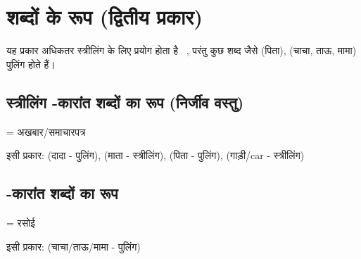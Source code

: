 \section{शब्दों के रूप (द्वितीय प्रकार)}\label{sec:noun-endings-second-declension}
यह प्रकार अधिकतर स्त्रीलिंग के लिए प्रयोग होता है ~\cite{readyruss2021, levine2009}, परंतु कुछ शब्द जैसे  (पिता),  (चाचा, ताऊ,
मामा) पुलिंग होते हैं।

\subsection{स्त्रीलिंग -कारांत शब्दों का रूप (निर्जीव वस्तु)}\label{subsec:noun-endings-second-declension-hard}
 = अखबार/समाचारपत्र

इसी प्रकार:  (दादा - पुलिंग),  (माता - स्त्रीलिंग),   (पिता - पुलिंग),  (गाड़ी/car - स्त्रीलिंग)

\subsection{-कारांत शब्दों का रूप}\label{subsec:noun-endings-second-declension-soft}
 = रसोई


इसी प्रकार:  (चाचा/ताऊ/मामा - पुलिंग)
